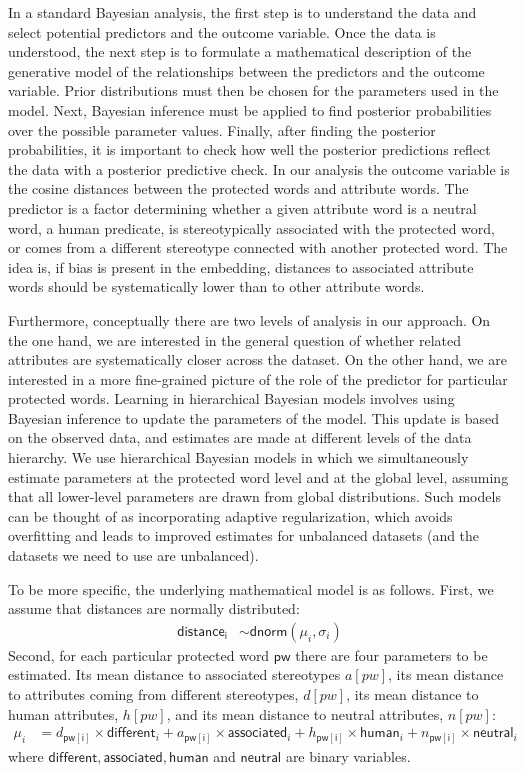 \documentclass[
  10pt,
  dvipsnames,enabledeprecatedfontcommands]{scrartcl}
\begin{document}
In a standard Bayesian analysis, the first step is to understand the
data and select potential predictors and the outcome variable. Once the
data is understood, the next step is to formulate a mathematical
description of the generative model of the relationships between the
predictors and the outcome variable. Prior distributions must then be
chosen for the parameters used in the model. Next, Bayesian inference
must be applied to find posterior probabilities over the possible
parameter values. Finally, after finding the posterior probabilities, it
is important to check how well the posterior predictions reflect the
data with a posterior predictive check. In our analysis the outcome
variable is the cosine distances between the protected words and
attribute words. The predictor is a factor determining whether a given
attribute word is a neutral word, a human predicate, is stereotypically
associated with the protected word, or comes from a different stereotype
connected with another protected word. The idea is, if bias is present
in the embedding, distances to associated attribute words should be
systematically lower than to other attribute words.

Furthermore, conceptually there are two levels of analysis in our
approach. On the one hand, we are interested in the general question of
whether related attributes are systematically closer across the dataset.
On the other hand, we are interested in a more fine-grained picture of
the role of the predictor for particular protected words. Learning in
hierarchical Bayesian models involves using Bayesian inference to update
the parameters of the model. This update is based on the observed data,
and estimates are made at different levels of the data hierarchy. We use
hierarchical Bayesian models in which we simultaneously estimate
parameters at the protected word level and at the global level, assuming
that all lower-level parameters are drawn from global distributions.
Such models can be thought of as incorporating adaptive regularization,
which avoids overfitting and leads to improved estimates for unbalanced
datasets (and the datasets we need to use are unbalanced).

To be more specific, the underlying mathematical model is as follows.
First, we assume that distances are normally distributed:
\begin{align*} \mathsf{distance_i} & \sim \mathsf{dnorm}(\mu_i,\sigma_i)
\end{align*} \noindent Second, for each particular protected word
\(\mathsf{pw}\) there are four parameters to be estimated. Its mean
distance to associated stereotypes \(a[pw]\), its mean distance to
attributes coming from different stereotypes, \(d[pw]\), its mean
distance to human attributes, \(h[pw]\), and its mean distance to
neutral attributes, \(n[pw]\): \begin{align*}
\mu_i & = d_{\mathsf{pw[i]}} \times \mathsf{different}_i  + a_{\mathsf{pw[i]}} \times \mathsf{associated}_i  + h_{\mathsf{pw[i]}} \times \mathsf{human}_i  + n_{\mathsf{pw[i]}}\times \mathsf{neutral}_i
\end{align*} \noindent where
\(\mathsf{different}, \mathsf{associated},\mathsf{human}\) and
\(\mathsf{neutral}\) are binary variables.
\end{document}
